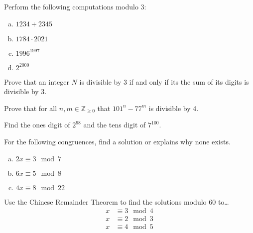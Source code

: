 \documentclass[11pt,letterpaper]{article}
\begin{document}
\homework{}

 Perform the following computations modulo 3:
\begin{enumerate}[(a)]
\item $1234 + 2345$
\item $1784 \cdot 2021$ 
\item $1996^{1997}$
\item $2^{2000}$
\end{enumerate} \pspace





\newpage





 Prove that an integer $N$ is divisible by 3 if and only if its the sum of its digits is divisible by 3. \pspace





\newpage





 Prove that for all $n, m \in \mathbb{Z}_{\geq 0}$ that $101^n - 77^m$ is divisible by 4. \pspace





\newpage





 Find the ones digit of $2^{98}$ and the tens digit of $7^{100}$. \pspace





\newpage





 For the following congruences, find a solution or explains why none exists.
\begin{enumerate}[(a)]
\item $2x \equiv 3 \mod 7$
\item $6x \equiv 5 \mod 8$
\item $4x \equiv 8 \mod 22$
\end{enumerate} \pspace





\newpage





 Use the Chinese Remainder Theorem to find the solutions modulo 60 to\dots
	\[
	\begin{aligned}
	x &\equiv 3 \mod 4 \\
	x&\equiv 2 \mod 3 \\
	x&\equiv 4 \mod 5
	\end{aligned}
	\] \pspace
\end{document}

